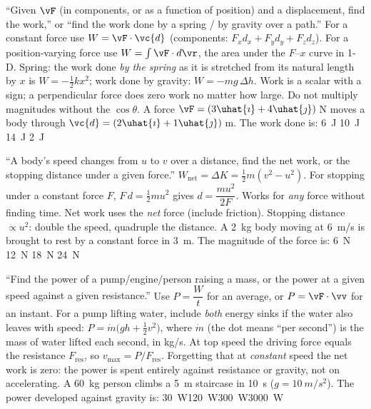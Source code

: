 {``Given $\vF$ (in components, or as a function of position) and a displacement, find the work,'' or
``find the work done by a spring / by gravity over a path.''}
{For a constant force use $W=\vF\cdot\vc{d}$ (components: $F_xd_x+F_yd_y+F_zd_z$). For a position-varying
force use $W=\int\vF\cdot d\vr$, the area under the $F$--$x$ curve in 1-D. Spring: the work done \emph{by the spring} as it is
stretched from its natural length by $x$ is $W=-\tfrac12 kx^2$; work done by gravity: $W=-mg\,\Delta h$.}
{Work is a scalar with a sign; a perpendicular force does zero work no matter how large. Do not multiply
magnitudes without the $\cos\theta$.}
{A force $\vF=(3\uhat{\imath}+4\uhat{\jmath})\,$N moves a body through
$\vc{d}=(2\uhat{\imath}+1\uhat{\jmath})\,$m. The work done is:}
{\SI{6}{J}}
{\SI{10}{J}}
{\SI{14}{J}}
{\SI{2}{J}}

{``A body's speed changes from $u$ to $v$ over a distance, find the net work, or the stopping
distance under a given force.''}
{$W_{\text{net}}=\Delta K=\tfrac12 m(v^2-u^2)$. For stopping under a constant force $F$,
$F\,d=\tfrac12 mu^2$ gives $d=\dfrac{mu^2}{2F}$. Works for \emph{any} force without finding time.}
{Net work uses the \emph{net} force (include friction). Stopping distance $\propto u^2$: double the speed,
quadruple the distance.}
{A \SI{2}{kg} body moving at \SI{6}{m/s} is brought to rest by a constant force in \SI{3}{m}. The
magnitude of the force is:}
{\SI{6}{N}}
{\SI{12}{N}}
{\SI{18}{N}}
{\SI{24}{N}}

{``Find the power of a pump/engine/person raising a mass, or the power at a given speed against a given
resistance.''}
{Use $P=\dfrac{W}{t}$ for an average, or $P=\vF\cdot\vv$ for an instant. For a pump lifting water,
include \emph{both} energy sinks if the water also leaves with speed: $P=\dot m\big(gh+\tfrac12v^2\big)$,
where $\dot m$ (the dot means ``per second'') is the mass of water lifted each second, in \si{kg/s}.
At top speed the driving force equals the resistance $F_{\text{res}}$, so $v_{\max}=P/F_{\text{res}}$.}
{Forgetting that at \emph{constant} speed the net work is zero: the power is spent entirely against
resistance or gravity, not on accelerating.}
{A \SI{60}{kg} person climbs a \SI{5}{m} staircase in \SI{10}{s} ($g=\SI{10}{m/s^2}$). The power
developed against gravity is:}
{\SI{30}{W}}{\SI{120}{W}}{\SI{300}{W}}{\SI{3000}{W}}

